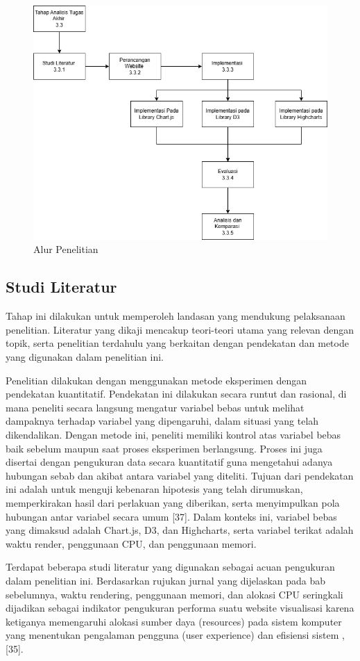 \begin{figure}[H]
	\centering
	\includegraphics[width=0.8\linewidth]{gambar/Metodologi/Alur penelitian.png}
	\caption{Alur Penelitian}
	\label{Alur Penelitian}
\end{figure}

\subsection{Studi Literatur}
Tahap ini dilakukan untuk memperoleh landasan yang mendukung pelaksanaan penelitian. Literatur yang dikaji mencakup teori-teori utama yang relevan dengan topik, serta penelitian terdahulu yang berkaitan dengan pendekatan dan metode yang digunakan dalam penelitian ini. 

Penelitian dilakukan dengan menggunakan metode eksperimen dengan pendekatan kuantitatif. Pendekatan ini dilakukan secara runtut dan rasional, di mana peneliti secara langsung mengatur variabel bebas untuk melihat dampaknya terhadap variabel yang dipengaruhi, dalam situasi yang telah dikendalikan. Dengan metode ini, peneliti memiliki kontrol atas variabel bebas baik sebelum maupun saat proses eksperimen berlangsung. Proses ini juga disertai dengan pengukuran data secara kuantitatif guna mengetahui adanya hubungan sebab dan akibat antara variabel yang diteliti. Tujuan dari pendekatan ini adalah untuk menguji kebenaran hipotesis yang telah dirumuskan, memperkirakan hasil dari perlakuan yang diberikan, serta menyimpulkan pola hubungan antar variabel secara umum [37]. Dalam konteks ini, variabel bebas yang dimaksud adalah Chart.js, D3, dan Highcharts, serta variabel terikat adalah waktu render, penggunaan CPU, dan penggunaan memori.

Terdapat beberapa studi literatur yang digunakan sebagai acuan pengukuran dalam penelitian ini. Berdasarkan rujukan jurnal yang dijelaskan pada bab sebelumnya, waktu rendering, penggunaan memori, dan alokasi CPU seringkali dijadikan sebagai indikator pengukuran performa suatu website visualisasi karena ketiganya memengaruhi alokasi sumber daya (resources) pada sistem komputer yang menentukan pengalaman pengguna (user experience) dan efisiensi sistem \cite{Persson2021} \cite{Persson2021}, [35].

